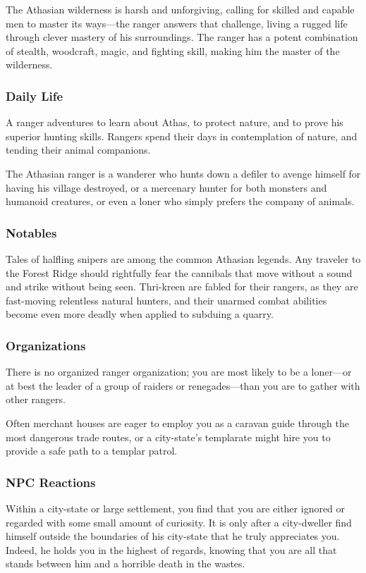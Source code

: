 The Athasian wilderness is harsh and unforgiving, calling for skilled and capable men to master its ways---the ranger answers that challenge, living a rugged life through clever mastery of his surroundings. The ranger has a potent combination of stealth, woodcraft, magic, and fighting skill, making him the master of the wilderness.

\subsubsection{Daily Life}
A ranger adventures to learn about Athas, to protect nature, and to prove his superior hunting skills. Rangers spend their days in contemplation of nature, and tending their animal companions.

The Athasian ranger is a wanderer who hunts down a defiler to avenge himself for having his village destroyed, or a mercenary hunter for both monsters and humanoid creatures, or even a loner who simply prefers the company of animals.

\subsubsection{Notables}
Tales of halfling snipers are among the common Athasian legends. Any traveler to the Forest Ridge should rightfully fear the cannibals that move without a sound and strike without being seen. Thri-kreen are fabled for their rangers, as they are fast-moving relentless natural hunters, and their unarmed combat abilities become even more deadly when applied to subduing a quarry.

\subsubsection{Organizations}
There is no organized ranger organization; you are most likely to be a loner---or at best the leader of a group of raiders or renegades---than you are to gather with other rangers.

Often merchant houses are eager to employ you as a caravan guide through the most dangerous trade routes, or a city-state's templarate might hire you to provide a safe path to a templar patrol.

\subsubsection{NPC Reactions}
Within a city-state or large settlement, you find that you are either ignored or regarded with some small amount of curiosity. It is only after a city-dweller find himself outside the boundaries of his city-state that he truly appreciates you. Indeed, he holds you in the highest of regards, knowing that you are all that stands between him and a horrible death in the wastes.

